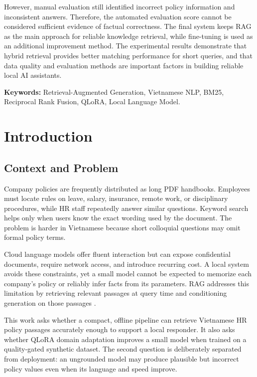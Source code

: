 \documentclass[12pt,a4paper,oneside]{report}
\begin{document}
However, manual evaluation still identified incorrect policy information and
inconsistent answers. Therefore, the automated evaluation score cannot be
considered sufficient evidence of factual correctness. The final system keeps
RAG as the main approach for reliable knowledge retrieval, while fine-tuning
is used as an additional improvement method. The experimental results
demonstrate that hybrid retrieval provides better matching performance for
short queries, and that data quality and evaluation methods are important
factors in building reliable local AI assistants.

\vspace{0.5cm}
\noindent\textbf{Keywords:} Retrieval-Augmented Generation, Vietnamese NLP,
BM25, Reciprocal Rank Fusion, QLoRA, Local Language Model.

\newpage
{}
\setcounter{page}{1}

\chapter{Introduction}

\section{Context and Problem}
Company policies are frequently distributed as long PDF handbooks. Employees
must locate rules on leave, salary, insurance, remote work, or disciplinary
procedures, while HR staff repeatedly answer similar questions. Keyword search
helps only when users know the exact wording used by the document. The problem
is harder in Vietnamese because short colloquial questions may omit formal
policy terms.

Cloud language models offer fluent interaction but can expose confidential
documents, require network access, and introduce recurring cost. A local system
avoids these constraints, yet a small model cannot be expected to memorize each
company's policy or reliably infer facts from its parameters. RAG addresses
this limitation by retrieving relevant passages at query time and conditioning
generation on those passages \cite{lewis2020rag}.

This work asks whether a compact, offline pipeline can retrieve Vietnamese HR
policy passages accurately enough to support a local responder. It also asks
whether QLoRA domain adaptation improves a small model when trained on a
quality-gated synthetic dataset. The second question is deliberately separated
from deployment: an ungrounded model may produce plausible but incorrect policy
values even when its language and speed improve.
\end{document}
